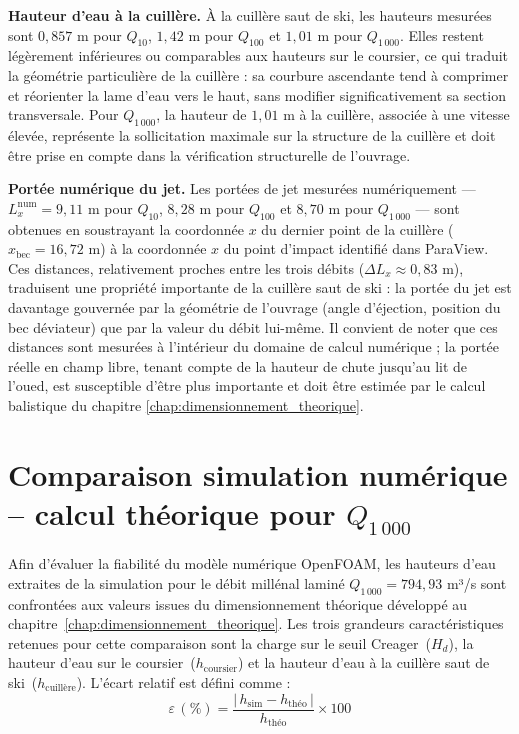 \medskip
\noindent\textbf{Hauteur d'eau à la cuillère.} À la cuillère saut de ski, les hauteurs mesurées sont $0{,}857$ m pour $Q_{10}$, $1{,}42$ m pour $Q_{100}$ et $1{,}01$ m pour $Q_{1\,000}$. Elles restent légèrement inférieures ou comparables aux hauteurs sur le coursier, ce qui traduit la géométrie particulière de la cuillère : sa courbure ascendante tend à comprimer et réorienter la lame d'eau vers le haut, sans modifier significativement sa section transversale. Pour $Q_{1\,000}$, la hauteur de $1{,}01$ m à la cuillère, associée à une vitesse élevée, représente la sollicitation maximale sur la structure de la cuillère et doit être prise en compte dans la vérification structurelle de l'ouvrage.

\medskip
\noindent\textbf{Portée numérique du jet.} Les portées de jet mesurées numériquement — $L_x^{\text{num}} = 9{,}11$ m pour $Q_{10}$, $8{,}28$ m pour $Q_{100}$ et $8{,}70$ m pour $Q_{1\,000}$ — sont obtenues en soustrayant la coordonnée $x$ du dernier point de la cuillère ($x_{\text{bec}} = 16{,}72$ m) à la coordonnée $x$ du point d'impact identifié dans ParaView. Ces distances, relativement proches entre les trois débits ($\Delta L_x \approx 0{,}83$ m), traduisent une propriété importante de la cuillère saut de ski : la portée du jet est davantage gouvernée par la géométrie de l'ouvrage (angle d'éjection, position du bec déviateur) que par la valeur du débit lui-même. Il convient de noter que ces distances sont mesurées à l'intérieur du domaine de calcul numérique ; la portée réelle en champ libre, tenant compte de la hauteur de chute jusqu'au lit de l'oued, est susceptible d'être plus importante et doit être estimée par le calcul balistique du chapitre \ref{chap:dimensionnement_theorique}.

\section{Comparaison simulation numérique – calcul théorique pour $Q_{1\,000}$}
\label{sec:comparaison_theorie_numerique}

Afin d'évaluer la fiabilité du modèle numérique OpenFOAM, les hauteurs d'eau extraites de la simulation pour le débit millénal laminé $Q_{1\,000} = 794{,}93$ m³/s sont confrontées aux valeurs issues du dimensionnement théorique développé au chapitre~\ref{chap:dimensionnement_theorique}. Les trois grandeurs caractéristiques retenues pour cette comparaison sont la charge sur le seuil Creager~($H_d$), la hauteur d'eau sur le coursier~($h_{\text{coursier}}$) et la hauteur d'eau à la cuillère saut de ski~($h_{\text{cuillère}}$). L'écart relatif est défini comme :
\begin{equation}
    \varepsilon\,(\%) = \frac{|\,h_{\text{sim}} - h_{\text{théo}}\,|}{h_{\text{théo}}} \times 100
\end{equation}

